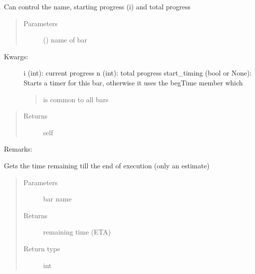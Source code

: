 \documentclass[a4paper,10pt,english]{sphinxmanual}
\begin{document}
\begin{fulllineitems}
\begin{fulllineitems}
Can control the name, starting progress (i) and total progress
\begin{quote}\begin{description}
\item[{Parameters}] \leavevmode
{} () \textendash{} name of bar

\end{description}\end{quote}
\begin{description}
\item[{Kwargs:}] \leavevmode
i (int): current progress
n (int): total progress
start\_timing (bool or None): Starts a timer for this bar, otherwise it uses the begTime member which
\begin{quote}

is common to all bars
\end{quote}

\end{description}
\begin{quote}\begin{description}
\item[{Returns}] \leavevmode
self

\end{description}\end{quote}

Remarks:

\end{fulllineitems}


\begin{fulllineitems}
\label{\detokenize{api/termtools.terminal.ProgressBarController:termtools.terminal.ProgressBarController.get_remaining_time}}
Gets the time remaining till the end of execution (only an estimate)
\begin{quote}\begin{description}
\item[{Parameters}] \leavevmode
{} \textendash{} bar name

\item[{Returns}] \leavevmode
remaining time (ETA)

\item[{Return type}] \leavevmode
int

\end{description}\end{quote}


\end{fulllineitems}
\end{fulllineitems}
\end{document}
